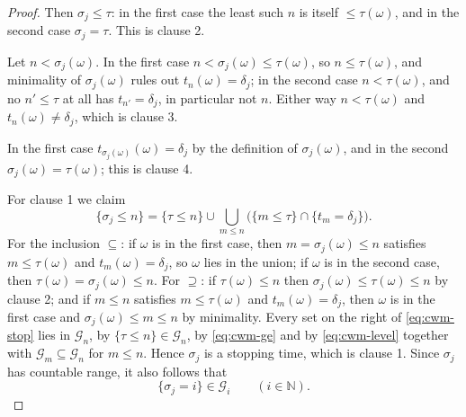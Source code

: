 \begin{proof}
Then $\sigma_j\le\tau$: in the first case the least such $n$ is itself
$\le\tau(\omega)$, and in the second case $\sigma_j=\tau$. This is clause 2.

Let $n<\sigma_j(\omega)$. In the first case $n<\sigma_j(\omega)\le\tau(\omega)$,
so $n\le\tau(\omega)$, and minimality of $\sigma_j(\omega)$ rules out
$t_n(\omega)=\delta_j$; in the second case $n<\tau(\omega)$, and no $n'\le\tau$
at all has $t_{n'}=\delta_j$, in particular not $n$. Either way $n<\tau(\omega)$
and $t_n(\omega)\ne\delta_j$, which is clause 3.

In the first case $t_{\sigma_j(\omega)}(\omega)=\delta_j$ by the definition of
$\sigma_j(\omega)$, and in the second $\sigma_j(\omega)=\tau(\omega)$; this is
clause 4.

For clause 1 we claim
\begin{equation}\label{eq:cwm-stop}
  \{\sigma_j\le n\}
   =\{\tau\le n\}\cup\bigcup_{m\le n}\bigl(\{m\le\tau\}\cap\{t_m=\delta_j\}\bigr).
\end{equation}
For the inclusion $\subseteq$: if $\omega$ is in the first case, then
$m=\sigma_j(\omega)\le n$ satisfies $m\le\tau(\omega)$ and
$t_m(\omega)=\delta_j$, so $\omega$ lies in the union; if $\omega$ is in the
second case, then $\tau(\omega)=\sigma_j(\omega)\le n$. For $\supseteq$: if
$\tau(\omega)\le n$ then $\sigma_j(\omega)\le\tau(\omega)\le n$ by clause 2; and
if $m\le n$ satisfies $m\le\tau(\omega)$ and $t_m(\omega)=\delta_j$, then
$\omega$ is in the first case and $\sigma_j(\omega)\le m\le n$ by minimality.
Every set on the right of \eqref{eq:cwm-stop} lies in $\mathcal G_n$, by
$\{\tau\le n\}\in\mathcal G_n$, by \eqref{eq:cwm-ge} and by
\eqref{eq:cwm-level} together with $\mathcal G_m\subseteq\mathcal G_n$ for
$m\le n$. Hence $\sigma_j$ is a stopping time, which is clause 1. Since
$\sigma_j$ has countable range, it also follows that
\begin{equation}\label{eq:cwm-eqi}
  \{\sigma_j=i\}\in\mathcal G_i\qquad(i\in\mathbb N).
\end{equation}


\end{proof}

